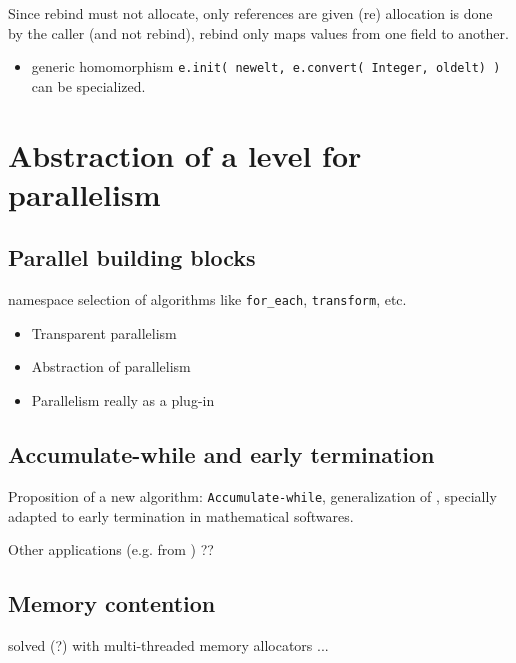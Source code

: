 \documentclass[runningheads,a4paper]{llncs}
\begin{document}
Since rebind must not allocate, only references are given (re)
allocation is done by the caller (and not rebind), rebind only maps
values from one field to another.

\begin{itemize}
\item generic homomorphism 
\verb!e.init( newelt, e.convert( Integer, oldelt) )!
can be specialized.
\end{itemize}

\section{Abstraction of a level for parallelism}
\subsection{Parallel building blocks}

namespace selection of algorithms like \verb!for_each!,
\verb!transform!, etc. 

\begin{itemize}
\item Transparent parallelism
\item Abstraction of parallelism
\item Parallelism really as a plug-in
\end{itemize}

\subsection{Accumulate-while and early termination}
Proposition of a new algorithm:
\verb!Accumulate-while!, generalization of \cite{jgd:2010:crt},
specially adapted to early termination in mathematical softwares.

Other applications (e.g. from \cite{Beaumont:2004:PMAA}) ??


\subsection{Memory contention}
solved (?) with multi-threaded memory allocators ...
\end{document}
